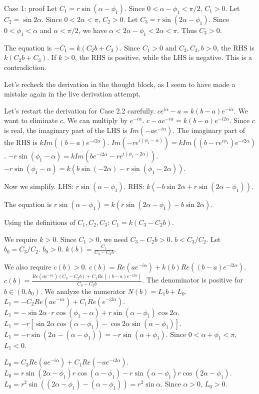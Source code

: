 \documentclass{article} %
\begin{document}
\begin{promptbox}{Case 1: proof}
Let $C_1 = r\sin(\alpha-\phi_1)$. Since $0<\alpha-\phi_1<\pi/2$, $C_1>0$.
Let $C_2 = \sin 2\alpha$. Since $0<2\alpha<\pi$, $C_2>0$.
Let $C_3 = r\sin(2\alpha-\phi_1)$. Since $0<\phi_1<\alpha$ and $\alpha<\pi/2$, we have $\alpha < 2\alpha-\phi_1 < 2\alpha < \pi$. Thus $C_3>0$.

The equation is $-C_1 = k(C_2 b + C_3)$.
Since $C_1>0$ and $C_2, C_3, b>0$, the RHS is $k(C_2 b + C_3)$. If $k>0$, the RHS is positive, while the LHS is negative. This is a contradiction.

Let's recheck the derivation in the thought block, as I seem to have made a mistake again in the live derivation attempt.

Let's restart the derivation for Case 2.2 carefully.
$ce^{i\alpha}-a = k(b-a)e^{-i\alpha}$.
We want to eliminate $c$. We can multiply by $e^{-i\alpha}$.
$c - ae^{-i\alpha} = k(b-a)e^{-i2\alpha}$.
Since $c$ is real, the imaginary part of the LHS is $Im(-ae^{-i\alpha})$.
The imaginary part of the RHS is $k Im((b-a)e^{-i2\alpha})$.
$Im(-re^{i(\phi_1-\alpha)}) = k Im((b-re^{i\phi_1})e^{-i2\alpha})$.
$-r\sin(\phi_1-\alpha) = k Im(be^{-i2\alpha} - re^{i(\phi_1-2\alpha)})$.
$-r\sin(\phi_1-\alpha) = k (b\sin(-2\alpha) - r\sin(\phi_1-2\alpha))$.

Now we simplify.
LHS: $r\sin(\alpha-\phi_1)$.
RHS: $k (-b\sin 2\alpha + r\sin(2\alpha-\phi_1))$.

The equation is $r\sin(\alpha-\phi_1) = k (r\sin(2\alpha-\phi_1) - b\sin 2\alpha)$.

Using the definitions of $C_1, C_2, C_3$:
$C_1 = k(C_3 - C_2 b)$.

We require $k>0$. Since $C_1>0$, we need $C_3-C_2 b > 0$.
$b < C_3/C_2$. Let $b_0 = C_3/C_2$. $b_0>0$.
$k(b) = \frac{C_1}{C_3-C_2 b}$.

We also require $c(b)>0$.
$c(b) = Re(ae^{-i\alpha}) + k(b) Re((b-a)e^{-i2\alpha})$.
$c(b) = \frac{Re(ae^{-i\alpha})(C_3-C_2 b) + C_1 Re((b-a)e^{-i2\alpha})}{C_3-C_2 b}$.
The denominator is positive for $b\in(0, b_0)$. We analyze the numerator $N(b) = L_1 b + L_0$.
$L_1 = -C_2 Re(ae^{-i\alpha}) + C_1 Re(e^{-i2\alpha})$.
$L_1 = -\sin 2\alpha \cdot r\cos(\phi_1-\alpha) + r\sin(\alpha-\phi_1)\cos 2\alpha$.
$L_1 = -r[\sin 2\alpha \cos(\alpha-\phi_1) - \cos 2\alpha \sin(\alpha-\phi_1)]$.
$L_1 = -r\sin(2\alpha - (\alpha-\phi_1)) = -r\sin(\alpha+\phi_1)$.
Since $0<\alpha+\phi_1<\pi$, $L_1<0$.

$L_0 = C_3 Re(ae^{-i\alpha}) + C_1 Re(-ae^{-i2\alpha})$.
$L_0 = r\sin(2\alpha-\phi_1) r\cos(\alpha-\phi_1) - r\sin(\alpha-\phi_1) r\cos(2\alpha-\phi_1)$.
$L_0 = r^2 \sin((2\alpha-\phi_1)-(\alpha-\phi_1)) = r^2\sin\alpha$.
Since $\alpha>0$, $L_0>0$.


\end{promptbox}
\end{document}
